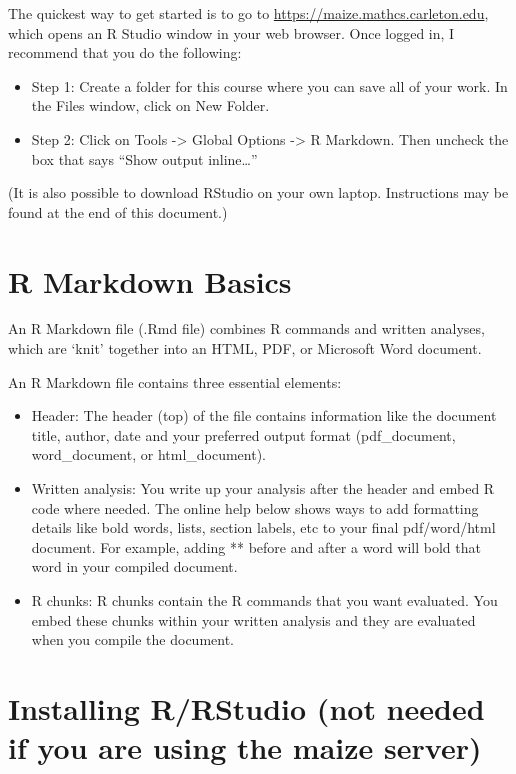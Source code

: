 \documentclass[
]{book}
\providecommand{\tightlist}{%
  \setlength{\itemsep}{0pt}\setlength{\parskip}{0pt}}
\begin{document}
The quickest way to get started is to go to \url{https://maize.mathcs.carleton.edu}, which opens an R Studio window in your web browser. Once logged in, I recommend that you do the following:

\begin{itemize}
\tightlist
\item
  Step 1: Create a folder for this course where you can save all of your work. In the Files window, click on New Folder.
\item
  Step 2: Click on Tools -\textgreater{} Global Options -\textgreater{} R Markdown. Then uncheck the box that says ``Show output inline\ldots{}''
\end{itemize}

(It is also possible to download RStudio on your own laptop. Instructions may be found at the end of this document.)

\hypertarget{r-markdown-basics}{%
\section{R Markdown Basics}\label{r-markdown-basics}}

An R Markdown file (.Rmd file) combines R commands and written analyses, which are `knit' together into an HTML, PDF, or Microsoft Word document.

An R Markdown file contains three essential elements:

\begin{itemize}
\item
  Header: The header (top) of the file contains information like the document title, author, date and your preferred output format (pdf\_document, word\_document, or html\_document).
\item
  Written analysis: You write up your analysis after the header and embed R code where needed. The online help below shows ways to add formatting details like bold words, lists, section labels, etc to your final pdf/word/html document. For example, adding ** before and after a word will bold that word in your compiled document.
\item
  R chunks: R chunks contain the R commands that you want evaluated. You embed these chunks within your written analysis and they are evaluated when you compile the document.
\end{itemize}

\hypertarget{installing-rrstudio-not-needed-if-you-are-using-the-maize-server}{%
\section{Installing R/RStudio (not needed if you are using the maize server)}\label{installing-rrstudio-not-needed-if-you-are-using-the-maize-server}}
\end{document}
